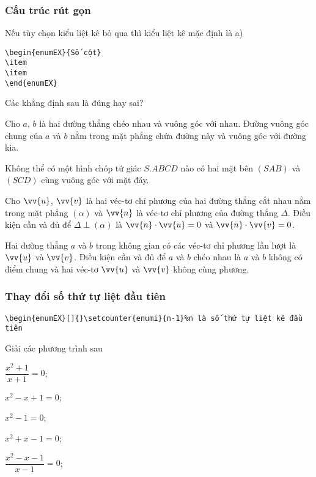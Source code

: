 \documentclass[12pt,a4paper,oneside]{article}
\def\vec{\vv}
\begin{document}
\subsubsection{Cấu trúc rút gọn}
Nếu tùy chọn kiểu liệt kê bỏ qua thì kiểu liệt kê mặc định là a)
\begin{verbatim}
\begin{enumEX}{Số cột}
\item 
\item 
\end{enumEX}
\end{verbatim}
\begin{ex}
Các khẳng định sau là đúng hay sai?
\begin{enumEX}{1}
	\item{} Cho $a$, $b$ là hai đường thẳng chéo nhau và vuông góc với nhau. Đường vuông góc chung của $a$ và $b$ nằm trong mặt phẳng chứa đường này và vuông góc với đường kia. 
	\item{}  Không thể có một hình chóp tứ giác $S.ABCD$ nào có hai mặt bên $(SAB)$ và $(SCD)$ cùng vuông góc với mặt đáy.
	\item{}   Cho $\vec{u}$, $\vec{v}$ là hai véc-tơ chỉ phương của hai đường thẳng cắt nhau nằm trong mặt phẳng $(\alpha)$ và $\vec{n}$ là véc-tơ chỉ phương của đường thẳng $\Delta$. Điều kiện cần và đủ để $\Delta\perp(\alpha)$ là $\vec{n}\cdot\vec{u}=0$ và $\vec{n}\cdot\vec{v}=0$.
	\item{}  Hai đường thẳng $a$ và $b$ trong không gian có các véc-tơ chỉ phương lần lượt là $\vec{u}$ và $\vec{v}$. Điều kiện cần và đủ để $a$ và $b$ chéo nhau là $a$ và $b$ không có điểm chung và hai véc-tơ $\vec{u}$ và $\vec{v}$ không cùng phương.
\end{enumEX}
\end{ex}
\subsubsection{Thay đổi số thứ tự  liệt đầu tiên}
\begin{verbatim}
\begin{enumEX}[]{}\setcounter{enumi}{n-1}%n là số thứ tự liệt kê đầu tiên
\end{verbatim}
\begin{ex}
Giải các phương trình sau
\begin{enumEX}{3}\setcounter{enumi}{3}
\item $\dfrac{x^2+1}{x+1}=0$;
\item $x^2-x+1=0$;
\item $x^2-1=0$;
\item $x^2+x-1=0$;
\item $\dfrac{x^2-x-1}{x-1}=0$;
\end{enumEX}
\end{ex}
\end{document}
